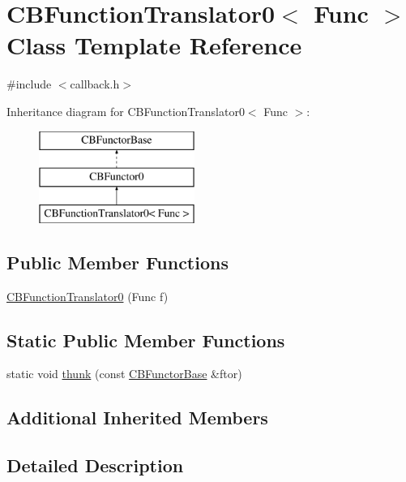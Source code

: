 \hypertarget{class_c_b_function_translator0}{\section{C\+B\+Function\+Translator0$<$ Func $>$ Class Template Reference}
\label{class_c_b_function_translator0}
}


{\ttfamily \#include $<$callback.\+h$>$}

Inheritance diagram for C\+B\+Function\+Translator0$<$ Func $>$\+:\begin{figure}[H]
\begin{center}
\leavevmode
\includegraphics[height=3.000000cm]{class_c_b_function_translator0}
\end{center}
\end{figure}
\subsection*{Public Member Functions}
\begin{DoxyCompactItemize}
\item 
\hyperlink{class_c_b_function_translator0_a61103ab74629845b2d346a3f0920926f}{C\+B\+Function\+Translator0} (Func f)
\end{DoxyCompactItemize}
\subsection*{Static Public Member Functions}
\begin{DoxyCompactItemize}
\item 
static void \hyperlink{class_c_b_function_translator0_aeff9debdc4e6a3678d12e026b617612a}{thunk} (const \hyperlink{class_c_b_functor_base}{C\+B\+Functor\+Base} \&ftor)
\end{DoxyCompactItemize}
\subsection*{Additional Inherited Members}


\subsection{Detailed Description}
